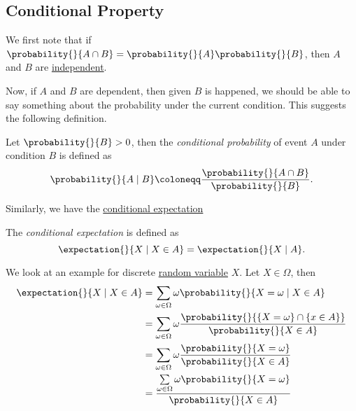 \subsection{Conditional Property}
\begin{prev}
	We first note that if \(\probability{}{A\cap B} = \probability{}{A} \probability{}{B} \), then \(A\) and \(B\) are \hyperref[def:independent]{independent}.
\end{prev}

Now, if \(A\) and \(B\) are dependent, then given \(B\) is happened, we should be able to say something about the probability under the current condition.
This suggests the following definition.

\begin{definition}\label{def:conditional-probability}
	Let \(\probability{}{B}>0\), then the \emph{conditional probability} of event \(A\) under condition \(B\) is defined as
	\[
		\probability{}{A \mid B}\coloneqq \frac{\probability{}{A\cap B}}{\probability{}{B}}.
	\]
\end{definition}

Similarly, we have the \hyperref[def:conditional-expectation]{conditional expectation}
\begin{definition}\label{def:conditional-expectation}
	The \emph{conditional expectation} is defined as
	\[
		\expectation{}{X \mid X\in A} = \expectation{}{X \mid A}.
	\]
\end{definition}

\begin{eg}
	We look at an example for discrete \hyperref[def:random-variable]{random variable} \(X\). Let \(X\in \Omega\), then
	\[
		\begin{split}
			\expectation{}{X \mid X\in A} &= \sum\limits_{\omega\in \Omega} \omega\probability{}{X = \omega \mid X\in A}\\
			&=\sum\limits_{\omega\in \Omega} \omega \frac{\probability{}{\left\{X = \omega\right\}\cap \left\{x\in A\right\}}}{\probability{}{X\in A} }\\
			&=\sum\limits_{\omega\in \Omega} \omega \frac{\probability{}{X = \omega}}{\probability{}{X\in A} }\\
			&=\frac{\sum\limits_{\omega\in \Omega} \omega \probability{}{X = \omega}}{\probability{}{X\in A}}
		\end{split}
	\]
\end{eg}

